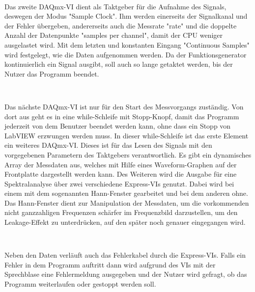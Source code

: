 		\
		
		Das zweite DAQmx-VI dient als Taktgeber für die Aufnahme des Signals, deswegen der Modus "Sample Clock".
		Ihm werden einerseits der Signalkanal und der Fehler übergeben, andererseits auch die Messrate "rate" und die doppelte Anzahl der Datenpunkte "samples per channel", damit der CPU weniger ausgelastet wird. 
		Mit dem letzten und konstanten Eingang "Continuous Samples" wird festgelegt, wie die Daten aufgenommen werden.
		Da der Funktionsgenerator kontinuierlich ein Signal ausgibt, soll auch so lange getaktet werden, bis der Nutzer das Programm beendet.
			
		\
		
		Das nächste DAQmx-VI ist nur für den Start des Messvorgangs zuständig.
		Von dort aus geht es in eine while-Schleife mit Stopp-Knopf, damit das Programm jederzeit von dem Benutzer beendet werden kann, ohne dass ein Stopp von LabVIEW erzwungen werden muss.
		In dieser while-Schleife ist das erste Element ein weiteres DAQmx-VI.
		Dieses ist für das Lesen des Signals mit den vorgegebenen Parametern des Taktgebers verantwortlich.
		Es gibt ein dynamisches Array der Messdaten aus, welches mit Hilfe eines Waveform-Graphen auf der Frontplatte dargestellt werden kann.  
		Des Weiteren wird die Ausgabe für eine Spektralanalyse über zwei verschiedene Express-VIs genutzt. 
		Dabei wird bei einem mit dem sogenannten Hann-Fenster gearbeitet und bei dem anderen ohne.
		Das Hann-Fenster dient zur Manipulation der Messdaten, um die vorkommenden nicht ganzzahligen Frequenzen schärfer im Frequenzbild darzustellen, um den Leakage-Effekt zu unterdrücken, auf den später noch genauer eingegangen wird.
			
		\
		
		Neben den Daten verläuft auch das Fehlerkabel durch die Express-VIs. 
		Falls ein Fehler in dem Programm auftritt dann wird aufgrund des VIs mit der Sprechblase eine Fehlermeldung ausgegeben und der Nutzer wird gefragt, ob das Programm weiterlaufen oder gestoppt werden soll.
			
		\
		
